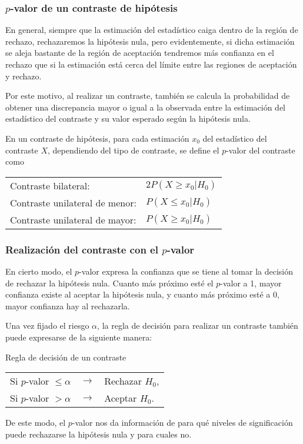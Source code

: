 \begin{frame}
\frametitle{$p$-valor de un contraste de hipótesis}
En general, siempre que la estimación del estadístico caiga dentro de la región de rechazo, rechazaremos la hipótesis nula, pero evidentemente, si dicha estimación se aleja bastante de la región de aceptación tendremos más confianza en el rechazo que si la estimación está cerca del límite entre las regiones de aceptación y rechazo.

Por este motivo, al realizar un contraste, también se calcula la probabilidad de obtener una discrepancia mayor o igual a la observada entre la estimación del estadístico del contraste y su valor esperado según la hipótesis nula.

\pause
\begin{definicion}[$p$-valor]
En un contraste de hipótesis, para cada estimación $x_0$ del estadístico del contraste $X$, dependiendo del tipo de
contraste, se define el $p$-valor del contraste como
\begin{center}
\begin{tabular}{ll}
Contraste bilateral: & $2P(X\geq x_0|H_0)$\\
Contraste unilateral de menor: & $P(X\leq x_0|H_0)$\\
Contraste unilateral de mayor: & $P(X\geq x_0|H_0)$
\end{tabular}
\end{center}
\end{definicion}
\end{frame}


\begin{frame}
\frametitle{Realización del contraste con el $p$-valor}
En cierto modo, el $p$-valor expresa la confianza que se tiene al tomar la decisión de rechazar la hipótesis nula.
Cuanto más próximo esté el $p$-valor a 1, mayor confianza existe al aceptar la hipótesis nula, y cuanto más próximo esté a 0, mayor confianza hay al rechazarla.

\pause
Una vez fijado el riesgo $\alpha$, la regla de decisión para realizar un contraste también puede expresarse de la siguiente manera:
\begin{alertblock}{Regla de decisión de un contraste}
\begin{center}
\begin{tabular}{lcl}
Si $p$-valor $\leq \alpha$ & $\rightarrow$ & Rechazar $H_0$,\\
Si $p$-valor $> \alpha$ & $\rightarrow$ & Aceptar $H_0$.\\
\end{tabular}
\end{center}
\end{alertblock}
De este modo, el $p$-valor nos da información de para qué niveles de significación puede rechazarse la hipótesis nula y para cuales no.
\end{frame}


